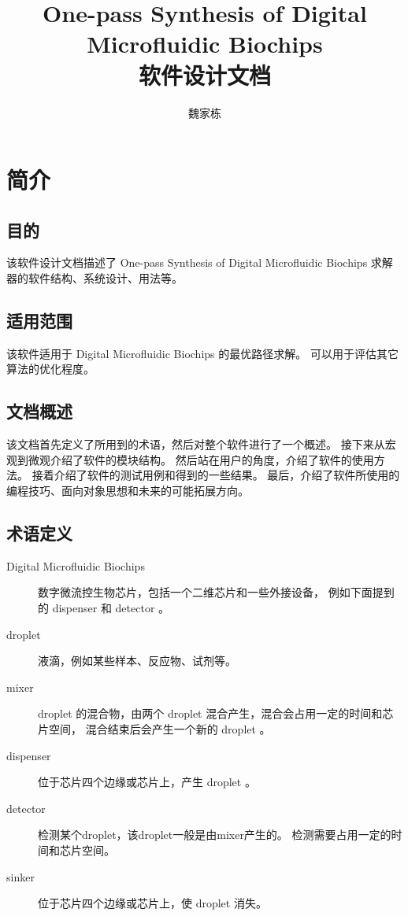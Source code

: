 \documentclass[UTF8, a4paper, titlepage]{ctexart}
\begin{document}
\title{One-pass Synthesis of Digital Microfluidic Biochips \\
	软件设计文档}
\author{魏家栋}
\maketitle
\tableofcontents
\newpage

\section{简介}
\subsection{目的}
该软件设计文档描述了 One-pass Synthesis of Digital Microfluidic Biochips
求解器的软件结构、系统设计、用法等。
\subsection{适用范围}
该软件适用于 Digital Microfluidic Biochips 的最优路径求解。%
可以用于评估其它算法的优化程度。
\subsection{文档概述}
该文档首先定义了所用到的术语，然后对整个软件进行了一个概述。%
接下来从宏观到微观介绍了软件的模块结构。%
然后站在用户的角度，介绍了软件的使用方法。%
接着介绍了软件的测试用例和得到的一些结果。%
最后，介绍了软件所使用的编程技巧、面向对象思想和未来的可能拓展方向。%
\subsection{术语定义}
\begin{description}
	\item[Digital Microfluidic Biochips] 数字微流控生物芯片，包括一个二维芯片和一些外接设备，%
	例如下面提到的 dispenser 和 detector 。
	\item[droplet] 液滴，例如某些样本、反应物、试剂等。
	\item[mixer] droplet 的混合物，由两个 droplet 混合产生，混合会占用一定的时间和芯片空间，%
	混合结束后会产生一个新的 droplet 。
	\item[dispenser] 位于芯片四个边缘或芯片上，产生 droplet 。
	\item[detector] 检测某个droplet，该droplet一般是由mixer产生的。%
	检测需要占用一定的时间和芯片空间。
	\item[sinker] 位于芯片四个边缘或芯片上，使 droplet 消失。
\end{description}
\end{document}
